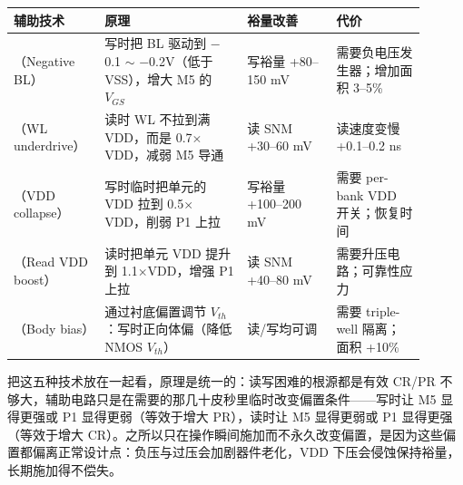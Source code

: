 \begin{longtable}{L{0.18\linewidth}L{0.32\linewidth}L{0.20\linewidth}L{0.20\linewidth}}
\toprule
辅助技术 & 原理 & 裕量改善 & 代价 \\
\midrule
{}（Negative BL） & 写时把 BL 驱动到 $-$0.1 $\sim$ $-$0.2V（低于 VSS），增大 M5 的 $V_{GS}$ & 写裕量 +80--150 mV & 需要负电压发生器；增加面积 3--5\% \\
（WL underdrive） & 读时 WL 不拉到满 VDD，而是 0.7$\times$VDD，减弱 M5 导通 & 读 SNM +30--60 mV & 读速度变慢 +0.1--0.2 ns \\
（VDD collapse） & 写时临时把单元的 VDD 拉到 0.5$\times$VDD，削弱 P1 上拉 & 写裕量 +100--200 mV & 需要 per-bank VDD 开关；恢复时间 \\
（Read VDD boost） & 读时把单元 VDD 提升到 1.1$\times$VDD，增强 P1 上拉 & 读 SNM +40--80 mV & 需要升压电路；可靠性应力 \\
（Body bias） & 通过衬底偏置调节 $V_{th}$：写时正向体偏（降低 NMOS $V_{th}$） & 读/写均可调 & 需要 triple-well 隔离；面积 +10\% \\
\bottomrule
\end{longtable}

把这五种技术放在一起看，原理是统一的：读写困难的根源都是有效 CR/PR 不够大，辅助电路只是在需要的那几十皮秒里临时改变偏置条件——写时让 M5 显得更强或 P1 显得更弱（等效于增大 PR），读时让 M5 显得更弱或 P1 显得更强（等效于增大 CR）。之所以只在操作瞬间施加而不永久改变偏置，是因为这些偏置都偏离正常设计点：负压与过压会加剧器件老化，VDD 下压会侵蚀保持裕量，长期施加得不偿失。


